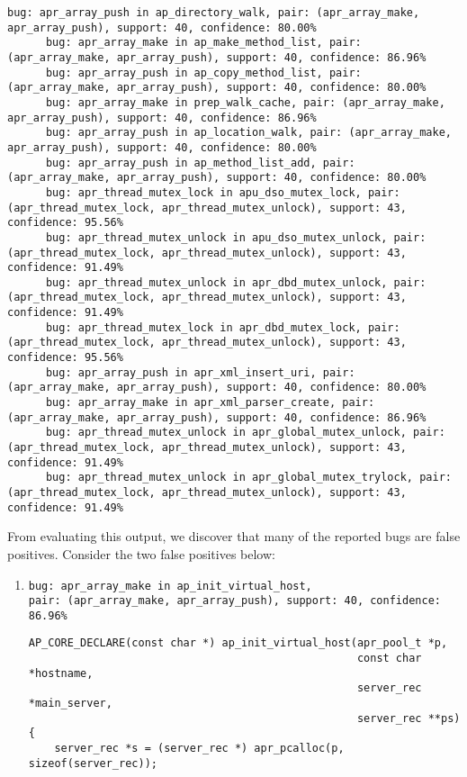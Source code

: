 \documentclass{article}
\begin{document}
\begin{enumerate}[(a)]
\begin{lstlisting}[basicstyle=\tiny\ttfamily]
      bug: apr_array_push in ap_directory_walk, pair: (apr_array_make, apr_array_push), support: 40, confidence: 80.00%
      bug: apr_array_make in ap_make_method_list, pair: (apr_array_make, apr_array_push), support: 40, confidence: 86.96%
      bug: apr_array_push in ap_copy_method_list, pair: (apr_array_make, apr_array_push), support: 40, confidence: 80.00%
      bug: apr_array_make in prep_walk_cache, pair: (apr_array_make, apr_array_push), support: 40, confidence: 86.96%
      bug: apr_array_push in ap_location_walk, pair: (apr_array_make, apr_array_push), support: 40, confidence: 80.00%
      bug: apr_array_push in ap_method_list_add, pair: (apr_array_make, apr_array_push), support: 40, confidence: 80.00%
      bug: apr_thread_mutex_lock in apu_dso_mutex_lock, pair: (apr_thread_mutex_lock, apr_thread_mutex_unlock), support: 43, confidence: 95.56%
      bug: apr_thread_mutex_unlock in apu_dso_mutex_unlock, pair: (apr_thread_mutex_lock, apr_thread_mutex_unlock), support: 43, confidence: 91.49%
      bug: apr_thread_mutex_unlock in apr_dbd_mutex_unlock, pair: (apr_thread_mutex_lock, apr_thread_mutex_unlock), support: 43, confidence: 91.49%
      bug: apr_thread_mutex_lock in apr_dbd_mutex_lock, pair: (apr_thread_mutex_lock, apr_thread_mutex_unlock), support: 43, confidence: 95.56%
      bug: apr_array_push in apr_xml_insert_uri, pair: (apr_array_make, apr_array_push), support: 40, confidence: 80.00%
      bug: apr_array_make in apr_xml_parser_create, pair: (apr_array_make, apr_array_push), support: 40, confidence: 86.96%
      bug: apr_thread_mutex_unlock in apr_global_mutex_unlock, pair: (apr_thread_mutex_lock, apr_thread_mutex_unlock), support: 43, confidence: 91.49%
      bug: apr_thread_mutex_unlock in apr_global_mutex_trylock, pair: (apr_thread_mutex_lock, apr_thread_mutex_unlock), support: 43, confidence: 91.49%
      \end{lstlisting}

      From evaluating this output, we discover that many of the reported bugs are false positives. Consider the two false positives below:

      \begin{enumerate}
      \item
        \begin{lstlisting}
bug: apr_array_make in ap_init_virtual_host,
pair: (apr_array_make, apr_array_push), support: 40, confidence: 86.96%
        \end{lstlisting}

        \begin{lstlisting}
AP_CORE_DECLARE(const char *) ap_init_virtual_host(apr_pool_t *p,
                                                   const char *hostname,
                                                   server_rec *main_server,
                                                   server_rec **ps)
{
    server_rec *s = (server_rec *) apr_pcalloc(p, sizeof(server_rec));


\end{lstlisting}
\end{enumerate}
\end{enumerate}
\end{document}

